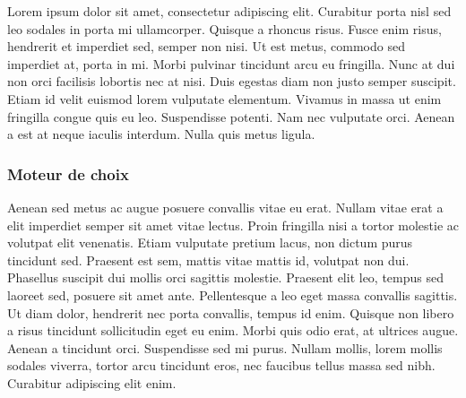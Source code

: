 Lorem ipsum dolor sit amet, consectetur adipiscing elit. Curabitur porta nisl sed leo sodales in porta mi ullamcorper. Quisque a rhoncus risus. Fusce enim risus, hendrerit et imperdiet sed, semper non nisi. Ut est metus, commodo sed imperdiet at, porta in mi. Morbi pulvinar tincidunt arcu eu fringilla. Nunc at dui non orci facilisis lobortis nec at nisi. Duis egestas diam non justo semper suscipit. Etiam id velit euismod lorem vulputate elementum. Vivamus in massa ut enim fringilla congue quis eu leo. Suspendisse potenti. Nam nec vulputate orci. Aenean a est at neque iaculis interdum. Nulla quis metus ligula. 

\subsubsection{Moteur de choix}

Aenean sed metus ac augue posuere convallis vitae eu erat. Nullam vitae erat a elit imperdiet semper sit amet vitae lectus. Proin fringilla nisi a tortor molestie ac volutpat elit venenatis. Etiam vulputate pretium lacus, non dictum purus tincidunt sed. Praesent est sem, mattis vitae mattis id, volutpat non dui. Phasellus suscipit dui mollis orci sagittis molestie. Praesent elit leo, tempus sed laoreet sed, posuere sit amet ante. Pellentesque a leo eget massa convallis sagittis. Ut diam dolor, hendrerit nec porta convallis, tempus id enim. Quisque non libero a risus tincidunt sollicitudin eget eu enim. Morbi quis odio erat, at ultrices augue. Aenean a tincidunt orci. Suspendisse sed mi purus. Nullam mollis, lorem mollis sodales viverra, tortor arcu tincidunt eros, nec faucibus tellus massa sed nibh. Curabitur adipiscing elit enim. 